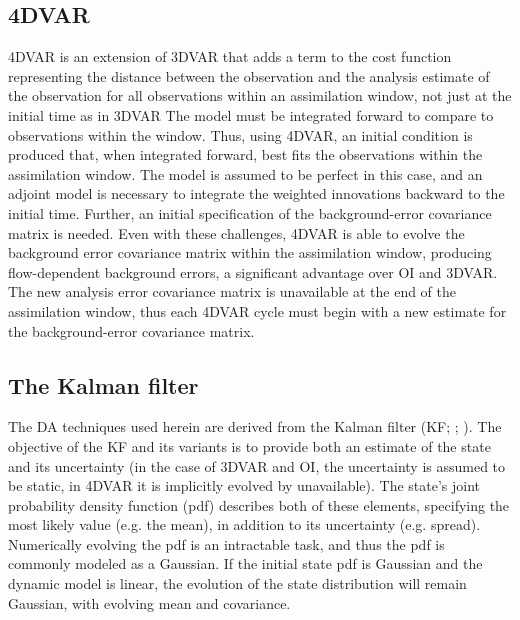 \subsection{4DVAR}
4DVAR is an extension of 3DVAR that adds a term to the cost function representing the distance between the observation and the analysis estimate of the observation for all observations within an assimilation window, not just at the initial time as in 3DVAR \citep{talagrandcourtier87} The model must be integrated forward to compare to observations within the window. Thus, using 4DVAR, an initial condition is produced that, when integrated forward, best fits the observations within the assimilation window. The model is assumed to be perfect in this case, and an adjoint model is necessary to integrate the weighted innovations backward to the initial time. Further, an initial specification of the background-error covariance matrix is needed. Even with these challenges, 4DVAR is able to evolve the background error covariance matrix within the assimilation window, producing flow-dependent background errors, a significant advantage over OI and 3DVAR. The new analysis error covariance matrix is unavailable at the end of the assimilation window, thus each 4DVAR cycle must begin with a new estimate for the background-error covariance matrix.

\subsection{The Kalman filter}
The DA techniques used herein are derived from the Kalman filter (KF; \citealt{kalman60}; \citealt{kalmanbucy61}). The objective of the KF and its variants is to provide both an estimate of the state and its uncertainty (in the case of 3DVAR and OI, the uncertainty is assumed to be static, in 4DVAR it is implicitly evolved by unavailable). The state’s joint probability density function (pdf) describes both of these elements, specifying the most likely value (e.g. the mean), in addition to its uncertainty (e.g. spread). Numerically evolving the pdf is an intractable task, and thus the pdf is commonly modeled as a Gaussian. If the initial state pdf is Gaussian and the dynamic model is linear, the evolution of the state distribution will remain Gaussian, with evolving mean and covariance.

